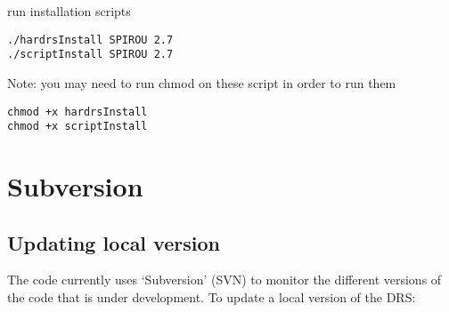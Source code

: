 run installation scripts

\begin{lstlisting}[style=bashstyle]
./hardrsInstall SPIROU 2.7
./scriptInstall SPIROU 2.7
\end{lstlisting}

\noindent Note: you may need to run chmod on these script in order to run them
\begin{lstlisting}[style=bashstyle]
chmod +x hardrsInstall
chmod +x scriptInstall
\end{lstlisting}

\section{Subversion}
\label{section:how_to_update}

\subsection{Updating local version}
The code currently uses `Subversion' (SVN) to monitor the different versions of the code that is under development. To update a local version of the DRS:

